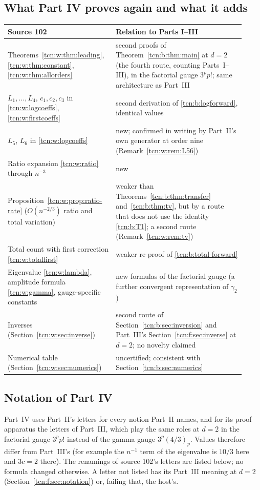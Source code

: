 \documentclass[11pt,letterpaper]{article}
\theoremstyle{remark}
\begin{document}
\subsection{What Part IV proves again and what it adds}\label{tcn:w:sec:map}
\begin{center}\small
\begin{tabular}{@{}>{\raggedright}p{0.4\linewidth}>{\raggedright\arraybackslash}p{0.52\linewidth}@{}}
\toprule
Source 102 & Relation to Parts I--III\\
\midrule
Theorems~\ref{tcn:w:thm:leading}, \ref{tcn:w:thm:constant}, \ref{tcn:w:thm:allorders} & second proofs of Theorem~\ref{tcn:b:thm:main} at $d=2$ (the fourth route, counting Parts~I--III), in the factorial gauge $3^pp!$; same architecture as Part~III\\
$L_1,\ldots,L_4$, $c_1,c_2,c_3$ in \eqref{tcn:w:logcoeffs}, \eqref{tcn:w:firstcoeffs} & second derivation of \eqref{tcn:b:logforward}, identical values\\
$L_5$, $L_6$ in \eqref{tcn:w:logcoeffs} & new; confirmed in writing by Part~II's own generator at order nine (Remark~\ref{tcn:w:rem:L56})\\
Ratio expansion \eqref{tcn:w:ratio} through $n^{-3}$ & new\\
Proposition~\ref{tcn:w:prop:ratio-rate} ($O(n^{-2/3})$ ratio and total variation) & weaker than Theorems~\ref{tcn:b:thm:transfer} and~\ref{tcn:b:thm:tv}, but by a route that does not use the identity \eqref{tcn:b:T1}; a second route (Remark~\ref{tcn:w:rem:tv})\\
Total count with first correction \eqref{tcn:w:totalfirst} & weaker re-proof of \eqref{tcn:b:total-forward}\\
Eigenvalue \eqref{tcn:w:lambda}, amplitude formula \eqref{tcn:w:gamma}, gauge-specific constants & new formulas of the factorial gauge (a further convergent representation of $\gamma_2$)\\
Inverses (Section~\ref{tcn:w:sec:inverse}) & second route of Section~\ref{tcn:b:sec:inversion} and Part~III's Section~\ref{tcn:f:sec:inverse} at $d=2$; no novelty claimed\\
Numerical table (Section~\ref{tcn:w:sec:numerics}) & uncertified; consistent with Section~\ref{tcn:b:sec:numerics}\\
\bottomrule
\end{tabular}
\end{center}

\subsection{Notation of Part IV}\label{tcn:w:sec:notation}
Part~IV uses Part~II's letters for every notion Part~II names, and for its proof apparatus the letters of Part~III, which play the same roles at $d=2$ in the factorial gauge $3^pp!$ instead of the gamma gauge $3^p(4/3)_p$. Values therefore differ from Part~III's (for example the $n^{-1}$ term of the eigenvalue is $10/3$ here and $3c=2$ there). The renamings of source 102's letters are listed below; no formula changed otherwise. A letter not listed has its Part~III meaning at $d=2$ (Section~\ref{tcn:f:sec:notation}) or, failing that, the host's.
\end{document}
